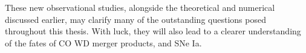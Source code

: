 These new observational studies, alongside the theoretical and numerical discussed earlier, may clarify many of the outstanding questions posed throughout this thesis.  With luck, they will also lead to a clearer understanding of the fates of CO WD merger products, and SNe Ia.






